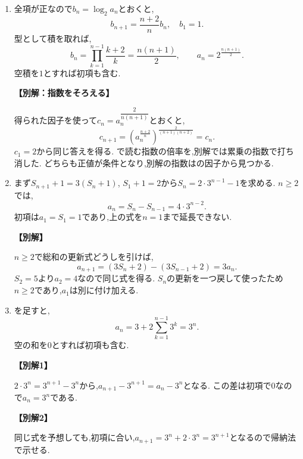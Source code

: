 \begin{enumerate}[label=\textbf{問\arabic*.},leftmargin=3.8em,format=\bookitemlink{practice-basic}{solution}{problem}]
          \item 全項が正なので$b_n=\log_2a_n$とおくと,
                  \[
                    b_{n+1}=\frac{n+2}{n}b_n,\quad b_1=1.
                  \]
                  型として積を取れば,
                  \[
                    b_n=\prod_{k=1}^{n-1}\frac{k+2}{k}=\frac{n(n+1)}2,
                    \qquad a_n=2^{\frac{n(n+1)}2}.
                  \]
                  空積を$1$とすれば初項も含む.
                  \par\smallskip\noindent\textbf{【別解：指数をそろえる】}\par
                  得られた因子を使って$c_n=a_n^{\dfrac{2}{n(n+1)}}$とおくと,
                  \[
                    c_{n+1}
                      =\left(a_n^{\frac{n+2}{n}}\right)^{\frac2{(n+1)(n+2)}}
                      =c_n.
                  \]
                  $c_1=2$から同じ答えを得る.
                  で読む指数の倍率を,別解では累乗の指数で打ち消した.
                  どちらも正値が条件となり,別解の指数はの因子から見つかる.

          \item まず$S_{n+1}+1=3(S_n+1)$, $S_1+1=2$から$S_n=2\cdot3^{n-1}-1$を求める.
                  $n\ge2$では,
                  \[
                    a_n=S_n-S_{n-1}=4\cdot3^{n-2}.
                  \]
                  初項は$a_1=S_1=1$であり,上の式を$n=1$まで延長できない.
                  \par\smallskip\noindent\textbf{【別解】}\par
                  $n\ge2$で総和の更新式どうしを引けば,
                  \[
                    a_{n+1}=(3S_n+2)-(3S_{n-1}+2)=3a_n.
                  \]
                  $S_2=5$より$a_2=4$なので同じ式を得る.
                  $S_n$の更新を一つ戻して使ったため$n\ge2$であり,$a_1$は別に付け加える.

          \item {}を足すと,
                  \[
                    a_n=3+2\sum_{k=1}^{n-1}3^k=3^n.
                  \]
                  空の和を$0$とすれば初項も含む.
                  \par\smallskip\noindent\textbf{【別解1】}\par
                  $2\cdot3^n=3^{n+1}-3^n$から,$a_{n+1}-3^{n+1}=a_n-3^n$となる.
                  この差は初項で$0$なので$a_n=3^n$である.
                  \par\smallskip\noindent\textbf{【別解2】}\par
                  同じ式を予想しても,初項に合い,$a_{n+1}=3^n+2\cdot3^n=3^{n+1}$となるので帰納法で示せる.


\end{enumerate}
